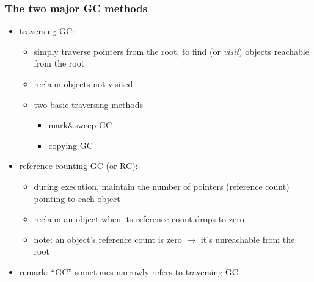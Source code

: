 \documentclass[12pt,dvipdfmx]{beamer}
\newif\ifja
\newif\ifeng
\newcommand{\mura}[1]{{\color{purple}#1}}
\newcommand{\ao}[1]{{\color{blue}#1}}
\begin{document}
\begin{frame}
\frametitle{The two major GC methods}
\begin{itemize}
\item \ao{traversing GC:}
  \begin{itemize}
  \item simply traverse pointers from the root, to find (or {\it visit})
    objects \mura{reachable from the root}
  \item \mura{reclaim objects not visited}
  \item two basic traversing methods 
    \begin{itemize}
    \item \ao{mark\&sweep GC}
    \item \ao{copying GC}
    \end{itemize}
  \end{itemize}
\item \ao{reference counting GC (or RC):}
  \begin{itemize}
  \item during execution,
    \mura{maintain the number of pointers (reference count)}
    pointing to each object 
  \item \mura{reclaim an object when its reference count drops to zero}
  \item note: an object's reference count is zero
    $\rightarrow$ it's unreachable from the root
  \end{itemize}
\item remark: ``GC'' sometimes narrowly refers to traversing GC
\end{itemize}
\end{frame}
\fi

\ifja
\subsection{走査型GC}
\fi
\ifeng
\end{document}
